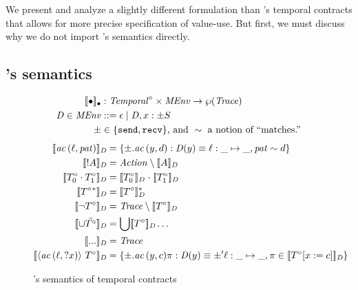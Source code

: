 We present and analyze a slightly different formulation than \dfm's temporal contracts that allows for more precise specification of value-use.
%
But first, we must discuss why we do not import \dfm's semantics directly.
%
\subsection{\dfm's semantics}
\newcommand{\denotedfm}[2]{\denote{#1}_{#2}}
\begin{figure}
\setlength{\abovedisplayskip}{0pt}
\setlength{\belowdisplayskip}{4pt}
\setlength{\abovedisplayshortskip}{0pt}
\setlength{\belowdisplayshortskip}{8pt}
  \begin{align*}
    \denotedfm{\bullet}{\bullet} &: \TContract^\circ \times \MEnv \to \wp(\mathit{Trace})
    \\
    \mmenv \in \MEnv &::= \epsilon \alt \mmenv, \mvar : \msendrec \mscon
    \\
    \msendrec &\in \setof{{\tt send}, {\tt recv}} \text{, and }\sim \text{ a notion of ``matches.''}
  \end{align*}
  \begin{align*}
    \denotedfm{\scevdfm{\mtoplevelname}{\mvpat}}{\mmenv} &=
      \setbuild{\msendrec.\scevdfm{y}{d}}{\mmenv(y) \equiv \sarr{\mtoplevelname}{\_}{\_}, \mvpat \sim d}
    \\
    \denotedfm{\snonevent{\mevent}}{\mmenv} &= \Action \setminus \denotedfm{\mevent}{\mmenv}
    \\
    \denotedfm{\stseq{\motcon_0}{\motcon_1}}{\mmenv} &= \denotedfm{\motcon_0}{\mmenv} \mathrel{\cdot} \denotedfm{\motcon_1}{\mmenv}
    \\
    \denotedfm{\stmany{\motcon{}}}{\mmenv} &= \stmany{\denotedfm{\motcon}{\mmenv}}
    \\
    \denotedfm{\stnot{\motcon}}{\mmenv} &= \mathit{Trace} \setminus \denotedfm{\motcon}{\mmenv}
    \\
    \denotedfm{\stOr{\isset{\motcon}}}{\mmenv} &= \bigcup\denotedfm{\motcon}{\mmenv}\ldots
    \\
    \denotedfm{\sddd}{\mmenv} &= \mathit{Trace}
    \\
    \denotedfm{\stbind{\scevdfm{\mtoplevelname}{? \mvar}}{\motcon}}{\mmenv} &= \setbuild{\msendrec.\scevdfm{y}{c}\mtrace}{\mmenv(y) \equiv \msendrec'\sarr{\mtoplevelname}{\_}{\_}, \mtrace \in \denotedfm{\motcon[\mvar := c]}{\mmenv}}
  \end{align*}
  \caption{\dfm's semantics of temporal contracts}
  \label{fig:dfm-semantics}
\end{figure}
